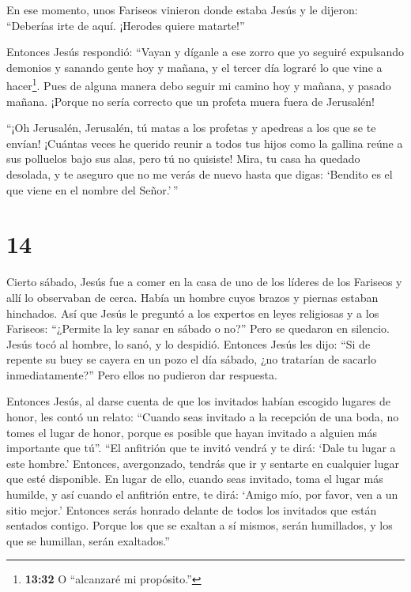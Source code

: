  En ese momento, unos Fariseos vinieron donde estaba Jesús
y le dijeron: ``Deberías irte de aquí. ¡Herodes quiere matarte!''

 Entonces Jesús respondió: ``Vayan y díganle a ese zorro
que yo seguiré expulsando demonios y sanando gente hoy y mañana, y el
tercer día lograré lo que vine a hacer\footnote{\textbf{13:32} O
  ``alcanzaré mi propósito.''}.  Pues de alguna manera debo
seguir mi camino hoy y mañana, y pasado mañana. ¡Porque no sería
correcto que un profeta muera fuera de Jerusalén!

 ``¡Oh Jerusalén, Jerusalén, tú matas a los profetas y
apedreas a los que se te envían! ¡Cuántas veces he querido reunir a
todos tus hijos como la gallina reúne a sus polluelos bajo sus alas,
pero tú no quisiste!  Mira, tu casa ha quedado desolada, y
te aseguro que no me verás de nuevo hasta que digas: `Bendito es el que
viene en el nombre del Señor.'\,''

\hypertarget{section-13}{%
\section{14}\label{section-13}}

 Cierto sábado, Jesús fue a comer en la casa de uno de los
líderes de los Fariseos y allí lo observaban de cerca. 
Había un hombre cuyos brazos y piernas estaban hinchados. 
Así que Jesús le preguntó a los expertos en leyes religiosas y a los
Fariseos: ``¿Permite la ley sanar en sábado o no?''  Pero se
quedaron en silencio. Jesús tocó al hombre, lo sanó, y lo despidió.
 Entonces Jesús les dijo: ``Si de repente su buey se cayera
en un pozo el día sábado, ¿no tratarían de sacarlo inmediatamente?''
 Pero ellos no pudieron dar respuesta.

 Entonces Jesús, al darse cuenta de que los invitados habían
escogido lugares de honor, les contó un relato:  ``Cuando
seas invitado a la recepción de una boda, no tomes el lugar de honor,
porque es posible que hayan invitado a alguien más importante que tú''.
 ``El anfitrión que te invitó vendrá y te dirá: `Dale tu
lugar a este hombre.' Entonces, avergonzado, tendrás que ir y sentarte
en cualquier lugar que esté disponible.  En lugar de ello,
cuando seas invitado, toma el lugar más humilde, y así cuando el
anfitrión entre, te dirá: `Amigo mío, por favor, ven a un sitio mejor.'
Entonces serás honrado delante de todos los invitados que están sentados
contigo.  Porque los que se exaltan a sí mismos, serán
humillados, y los que se humillan, serán exaltados.''


